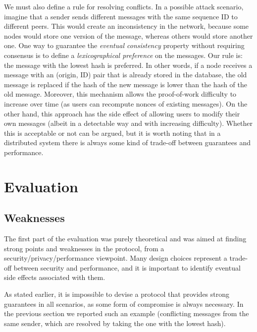 \documentclass[a4paper,12pt]{article}
\begin{document}
We must also define a rule for resolving conflicts. In a possible attack scenario, imagine that a sender sends different messages with the same sequence ID to different peers. This would create an inconsistency in the network, because some nodes would store one version of the message, whereas others would store another one. One way to guarantee the \emph{eventual consistency} property without requiring consensus is to define a \emph{lexicographical preference} on the messages. Our rule is: the message with the lowest hash is preferred. In other words, if a node receives a message with an (origin, ID) pair that is already stored in the database, the old message is replaced if the hash of the new message is lower than the hash of the old message. Moreover, this mechanism allows the proof-of-work difficulty to increase over time (as users can recompute nonces of existing messages). On the other hand, this approach has the side effect of allowing users to modify their own messages (albeit in a detectable way and with increasing difficulty). Whether this is acceptable or not can be argued, but it is worth noting that in a distributed system there is always some kind of trade-off between guarantees and performance.

\section{Evaluation} %
\subsection*{Weaknesses}
The first part of the evaluation was purely theoretical and was aimed at finding strong points and weaknesses in the protocol, from a security/privacy/performance viewpoint. Many design choices represent a trade-off between security and performance, and it is important to identify eventual side effects associated with them.

As stated earlier, it is impossible to devise a protocol that provides strong guarantees in all scenarios, as some form of compromise is always necessary. In the previous section we reported such an example (conflicting messages from the same sender, which are resolved by taking the one with the lowest hash).
\end{document}
